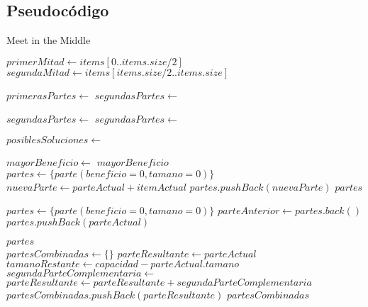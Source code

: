 \documentclass[10pt, a4paper]{article}
\begin{document}
\subsection{Pseudocódigo}
\begin{algorithm}
\caption{Meet in the Middle}
\begin{algorithmic}[1]
	\State $primerMitad \gets items[0..items.size / 2]$
	\State $segundaMitad \gets items[items.size / 2..items.size]$

	\State $primerasPartes \gets $ 
	\State $segundasPartes \gets $ 

	\State $segundasPartes \gets $ 
	\State $segundasPartes \gets $ 

	\State $posiblesSoluciones \gets $ 

	\State $mayorBeneficio \gets $ 
	\State \Return $mayorBeneficio$
\EndFunction
\\
	\State $partes \gets \{parte(beneficio=0, tamano=0)\}$
			\State $nuevaParte \gets parteActual + itemActual$
				\State $partes.pushBack(nuevaParte)$
			\EndIf
		\EndFor
	\EndFor
	\State \Return $partes$
\EndFunction
\\

	\State $partes \gets \{parte(beneficio=0, tamano=0)\}$
		\State $parteAnterior \gets partes.back()$
			\State $partes.pushBack(parteActual)$
		\EndIf
	\EndFor

	\State \Return $partes$
\EndFunction
\\
	\State $partesCombinadas \gets \{\}$
		\State $parteResultante \gets parteActual$
		\State $tamanoRestante \gets capacidad - parteActual.tamano$
		\State $segundaParteComplementaria \gets$
			\State $parteResultante \gets parteResultante + segundaParteComplementaria$
		\EndIf
		\State $partesCombinadas.pushBack(parteResultante)$
	\EndFor
	\State \Return $partesCombinadas$
\EndFunction
\end{algorithmic}
\end{algorithm}



\end{document}
